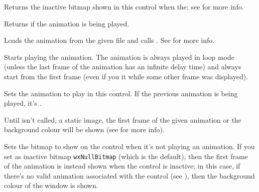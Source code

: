 \label{wxanimationctrlgetinactivebitmap}


Returns the inactive bitmap shown in this control when the;
see  for more info.


\label{wxanimationctrlisplaying}


Returns \true if the animation is being played.


\label{wxanimationctrlloadfile}


Loads the animation from the given file and calls .
See  for more info.


\label{wxanimationctrlplay}


Starts playing the animation.
The animation is always played in loop mode (unless the last frame of the animation
has an infinite delay time) and always start from the first frame
(even if you  it while some other frame was
displayed).


\label{wxanimationctrlsetanimation}


Sets the animation to play in this control.
If the previous animation is being played, it's .

Until  isn't called, a static image, the first
frame of the given animation or the background colour will be shown
(see  for more info).


\label{wxanimationctrlsetinactivebitmap}


Sets the bitmap to show on the control when it's not playing an animation.
If you set as inactive bitmap {\tt wxNullBitmap} (which is the default), then the
first frame of the animation is instead shown when the control is inactive; in this case,
if there's no valid animation associated with the control (see ),
then the background colour of the window is shown.

